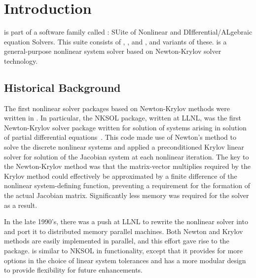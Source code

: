 \chapter{Introduction}\label{s:intro}

{\kinsol} is part of a software family called {\sundials}: SUite
of Nonlinear and DIfferential/ALgebraic equation Solvers. This
suite consists of {\cvode}, {\kinsol}, and {\ida}, and variants of
these.
%
{\kinsol} is a
general-purpose nonlinear system solver based on Newton-Krylov
solver technology.

\section{Historical Background}\label{ss:history}

  The first
nonlinear solver packages based on Newton-Krylov methods were
written in {\F}.  In particular, the NKSOL package, written at
LLNL, was the first Newton-Krylov solver package written for
solution of systems arising in solution of partial differential
equations~\cite{BrSa:90}.  This {\F} code made use of Newton's
method to solve the discrete nonlinear systems and applied a
preconditioned Krylov linear solver for solution of the Jacobian
system at each nonlinear iteration.  The key to the Newton-Krylov
method was that the matrix-vector multiplies required by the
Krylov method could effectively be approximated by a finite
difference of the nonlinear system-defining function, preventing a
requirement for the formation of the actual Jacobian matrix.
Significantly less memory was required for the solver as a result.

In the late 1990's, there was a push at LLNL to rewrite the
nonlinear solver into {\C} and port it to distributed memory
parallel machines.  Both Newton and Krylov methods are easily
implemented in parallel, and this effort gave rise to the
{\kinsol} package. {\kinsol} is similar to NKSOL in functionality,
except that it provides for more options in the choice of linear
system tolerances and has a more modular design to provide
flexibility for future enhancements.

